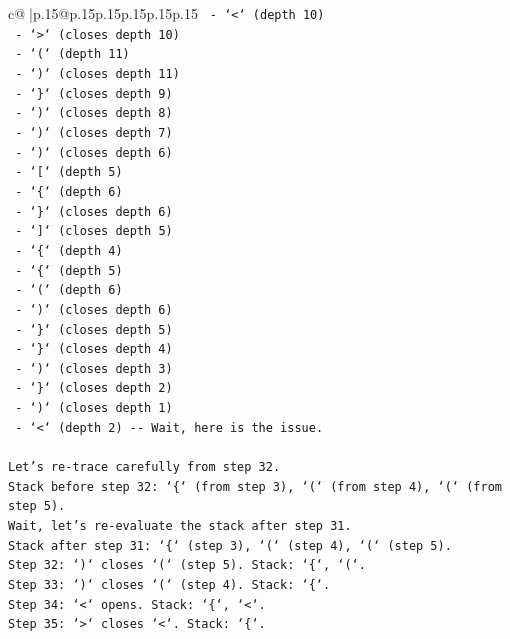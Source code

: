 \documentclass{article}
\begin{document}
{\begin{supertabular}{c@{$\;$}|p{.15\linewidth}@{}p{.15\linewidth}p{.15\linewidth}p{.15\linewidth}p{.15\linewidth}p{.15\linewidth}}
{{{\texttt{  {-} `<` (depth 10)} \\
\texttt{  {-} `>` (closes depth 10)} \\
\texttt{  {-} `(` (depth 11)} \\
\texttt{  {-} `)` (closes depth 11)} \\
\texttt{  {-} `\}` (closes depth 9)} \\
\texttt{  {-} `)` (closes depth 8)} \\
\texttt{  {-} `)` (closes depth 7)} \\
\texttt{  {-} `)` (closes depth 6)} \\
\texttt{  {-} `{[}` (depth 5)} \\
\texttt{  {-} `\{` (depth 6)} \\
\texttt{  {-} `\}` (closes depth 6)} \\
\texttt{  {-} `{]}` (closes depth 5)} \\
\texttt{  {-} `\{` (depth 4)} \\
\texttt{  {-} `\{` (depth 5)} \\
\texttt{  {-} `(` (depth 6)} \\
\texttt{  {-} `)` (closes depth 6)} \\
\texttt{  {-} `\}` (closes depth 5)} \\
\texttt{  {-} `\}` (closes depth 4)} \\
\texttt{  {-} `)` (closes depth 3)} \\
\texttt{  {-} `\}` (closes depth 2)} \\
\texttt{  {-} `)` (closes depth 1)} \\
\texttt{  {-} `<` (depth 2) {-}{-} Wait, here is the issue.} \\
\\ 
\texttt{Let's re{-}trace carefully from step 32.} \\
\texttt{Stack before step 32: `\{` (from step 3), `(` (from step 4), `(` (from step 5).} \\
\texttt{Wait, let's re{-}evaluate the stack after step 31.} \\
\texttt{Stack after step 31: `\{` (step 3), `(` (step 4), `(` (step 5).} \\
\texttt{Step 32: `)` closes `(` (step 5). Stack: `\{`, `(`.} \\
\texttt{Step 33: `)` closes `(` (step 4). Stack: `\{`.} \\
\texttt{Step 34: `<` opens. Stack: `\{`, `<`.} \\
\texttt{Step 35: `>` closes `<`. Stack: `\{`.} \\
}}}
\end{supertabular}}
\end{document}
